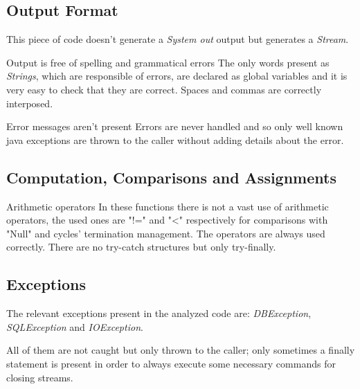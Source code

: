 \documentclass[9pt]{beamer}
\makeatletter
\newcommand*{\currentname}{\@currentlabelname}
\makeatother
\begin{document}
\subsection{Output Format}
\begin{frame}{\currentname}
This piece of code doesn't generate a \emph{System out} output but generates a \emph{Stream}. 

\begin{exampleblock}{Output is free of spelling and grammatical errors}
The only words present as \emph{Strings}, which are responsible of errors, are declared as global variables and it is very easy to check that they are correct. Spaces and commas are correctly interposed.
\end{exampleblock}

\begin{block}{Error messages aren't present}
Errors are never handled and so only well known java exceptions are thrown to the caller without adding details about the error.
\end{block}

\end{frame}

\subsection{Computation, Comparisons and Assignments}
\begin{frame}{\currentname}

\begin{exampleblock}{Arithmetic operators}
In these functions there is not a vast use of arithmetic operators, the used ones are "!=" and "\textless" respectively for comparisons with "Null" and cycles' termination management. The operators are always used correctly. There are no try-catch structures but only try-finally.
\end{exampleblock}

\end{frame}

\subsection{Exceptions}
\begin{frame}{\currentname}

The relevant exceptions present in the analyzed code are: 
\emph{DBException}, \emph{SQLException} and \emph{IOException}.

All of them are not caught but only thrown to the caller; only sometimes a finally statement is present in order to always execute some necessary commands for closing streams.
\end{frame}
\end{document}

